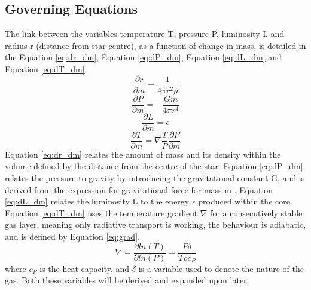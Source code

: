 \documentclass[10pt, nofootinbib, twocolumn]{revtex4-1}
\begin{document}
\subsection{Governing Equations}
The link between the variables temperature T, pressure P, luminosity L and radius r (distance from star centre), as a function of change in mass, is detailed in the Equation \eqref{eq:dr_dm}, Equation \eqref{eq:dP_dm}, Equation \eqref{eq:dL_dm} and Equation \eqref{eq:dT_dm}.
\begin{equation}\label{eq:dr_dm}
    \frac{\partial r}{\partial m} = \frac{1}{4\pi r^2 \rho}
\end{equation}
\begin{equation}\label{eq:dP_dm}
    \frac{\partial P}{\partial m} = -\frac{Gm}{4\pi r^4}
\end{equation}
\begin{equation}\label{eq:dL_dm}
    \frac{\partial L}{\partial m} = \epsilon
\end{equation}
\begin{equation}\label{eq:dT_dm}
    \frac{\partial T}{\partial m} = \nabla\frac{T}{P}\frac{\partial P}{\partial m}
\end{equation}
Equation \eqref{eq:dr_dm} relates the amount of mass and its density within the volume defined by the distance from the centre of the star.
Equation \eqref{eq:dP_dm} relates the pressure to gravity by introducing the gravitational constant G, and is derived from the expression for gravitational force for mass m \cite{ast}. Equation \eqref{eq:dL_dm} relates the luminosity L to the energy $\epsilon$ produced within the core. Equation \eqref{eq:dT_dm} uses the temperature gradient $\nabla$ for a consecutively stable gas layer, meaning only radiative transport is working, the behaviour is adiabatic, and is defined by Equation \eqref{eq:grad}. 
\begin{equation}\label{eq:grad}
    \nabla = \frac{\partial ln(T)}{\partial ln(P)} = \frac{P \delta}{T\rho c_P}%
\end{equation}
where $c_P$ is the heat capacity, and $\delta $ is a variable used to denote the nature of the gas. Both these variables will be derived and expanded upon later.
\end{document}
